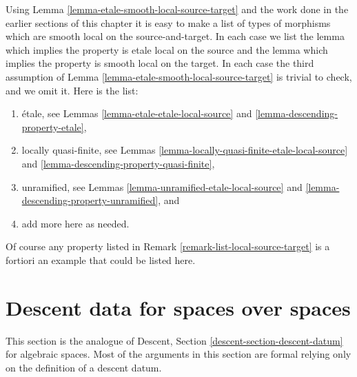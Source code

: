 \begin{remark}
\label{remark-list-etale-smooth-local-source-target}
Using Lemma \ref{lemma-etale-smooth-local-source-target}
and the work done in the earlier sections of this chapter it is easy
to make a list of types of morphisms which are smooth local on the
source-and-target. In each case we list the lemma which implies
the property is etale local on the source and the lemma which implies
the property is smooth local on the target. In each case the third assumption
of Lemma \ref{lemma-etale-smooth-local-source-target}
is trivial to check, and we omit it. Here is the list:
\begin{enumerate}
\item \'etale, see
Lemmas \ref{lemma-etale-etale-local-source} and
\ref{lemma-descending-property-etale},
\item locally quasi-finite, see
Lemmas \ref{lemma-locally-quasi-finite-etale-local-source} and
\ref{lemma-descending-property-quasi-finite},
\item unramified, see
Lemmas \ref{lemma-unramified-etale-local-source} and
\ref{lemma-descending-property-unramified}, and
\item add more here as needed.
\end{enumerate}
Of course any property listed in
Remark \ref{remark-list-local-source-target}
is a fortiori an example that could be listed here.
\end{remark}







\section{Descent data for spaces over spaces}
\label{section-descent-datum}

\noindent
This section is the analogue of Descent, Section
\ref{descent-section-descent-datum} for algebraic spaces.
Most of the arguments in this section are formal relying only
on the definition of a descent datum.

